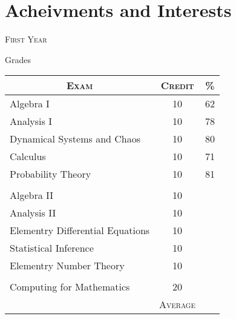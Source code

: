 \documentclass[a4paper, 11pt]{article}
\begin{document}
\section{Acheivments and Interests}


\bigskip
\par{\centering\Large {\textsc{First Year}}
\par}\large{\centering Grades\par}\normalsize

\begin{center}
\begin{tabular}{lcc}

\multicolumn{1}{c}{\textsc{Exam}} & \textsc{Credit}&\textsc{\%}\\ \hline
Algebra I & 10 & 62\\
Analysis I & 10 & 78\\
Dynamical Systems and Chaos & 10 & 80\\
Calculus & 10 & 71\\
Probability Theory & 10 & 81\\
\\
Algebra II & 10 & \\
Analysis II & 10 & \\
Elementry Differential Equations & 10 & \\
Statistical Inference & 10 & \\
Elementry Number Theory & 10 & \\
\\
Computing for Mathematics & 20 & \\
\cline{2-3}
&\textsc{Average}&\textbf{}

\end{tabular}
\end{center}
\bigskip
\end{document}
